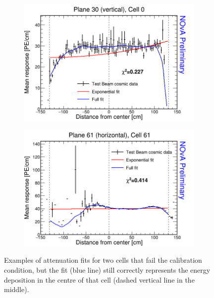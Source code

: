 
\begin{figure}[h]
\centering
\begin{subfigure}[b]{0.495\textwidth}
\centering
\includegraphics[width=\textwidth]{Plots/TBCalibration/ExampleForBrightFile_fb0_030_000.png}
\end{subfigure}
\begin{subfigure}[b]{0.495\textwidth}
\centering
\includegraphics[width=\textwidth]{Plots/TBCalibration/ExampleForBrightFile_fb5_061_061.png}
\end{subfigure}
\caption[Example of failed attenuation fits used for the Test Beam fibre brightness file]{Examples of attenuation fits for two cells that fail the calibration condition, but the fit (blue line) still correctly represents the energy deposition in the centre of that cell (dashed vertical line in the middle).}
\label{fig:FiberBrightnessExamples}
\end{figure}

